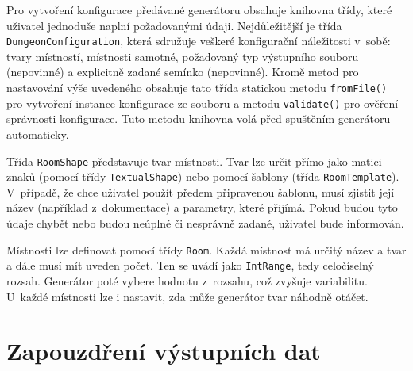 Pro vytvoření konfigurace předávané generátoru obsahuje knihovna třídy, které uživatel jednoduše naplní požadovanými údaji.
Nejdůležitější je třída \texttt{DungeonConfiguration}, která sdružuje veškeré konfigurační náležitosti v~sobě: tvary místností, místnosti samotné, požadovaný typ výstupního souboru (nepovinné) a explicitně zadané semínko (nepovinné).
Kromě metod pro nastavování výše uvedeného obsahuje tato třída statickou metodu \texttt{fromFile()} pro vytvoření instance konfigurace ze souboru a metodu \texttt{validate()} pro ověření správnosti konfigurace.
Tuto metodu knihovna volá před spuštěním generátoru automaticky.
\par
Třída \texttt{RoomShape} představuje tvar místnosti.
Tvar lze určit přímo jako matici znaků (pomocí třídy \texttt{TextualShape}) nebo pomocí šablony (třída \texttt{RoomTemplate}).
V~případě, že chce uživatel použít předem připravenou šablonu, musí zjistit její název (například z~dokumentace) a parametry, které přijímá.
Pokud budou tyto údaje chybět nebo budou neúplné či nesprávně zadané, uživatel bude informován.
\par
Místnosti lze definovat pomocí třídy \texttt{Room}.
Každá místnost má určitý název a tvar a dále musí mít uveden počet.
Ten se uvádí jako \texttt{IntRange}, tedy celočíselný rozsah.
Generátor poté vybere hodnotu z~rozsahu, což zvyšuje variabilitu.
U~každé místnosti lze i nastavit, zda může generátor tvar náhodně otáčet.


\section{Zapouzdření výstupních dat}


